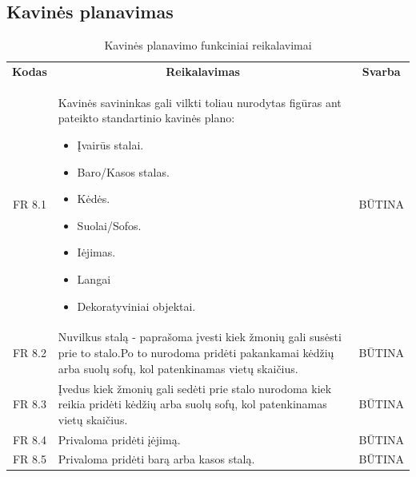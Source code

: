 \documentclass{VUMIFPSkursinis}
\begin{document}
\subsection{Kavinės planavimas}
\begin{center}
	\begin{table}[H]
	\caption{Kavinės planavimo funkciniai reikalavimai}
	\begin{tabular}{|p{2cm}|p{}|p{}|}
	
	\hline
	    \rowcolor{lightgray}
		\multicolumn{3}{|c|}{Kavinės planavimas}\\
		
	\hline
		\multicolumn{1}{|c|}{{\bfseries Kodas}}&
		\multicolumn{1}{|c|}{{\bfseries Reikalavimas}}&
		\multicolumn{1}{|c|}{{\bfseries Svarba}}\\

	\hline
		\multicolumn{1}{|c|}{FR 8.1}&
		{Kavinės savininkas gali vilkti toliau nurodytas figūras ant pateikto standartinio kavinės plano:
		\begin{itemize}
			\item Įvairūs stalai.
			\item Baro/Kasos stalas.
			\item Kėdės.
			\item Suolai/Sofos.
			\item Iėjimas.
			\item Langai
			\item Dekoratyviniai objektai.
		\end{itemize}}&
		\multicolumn{1}{|c|}{BŪTINA}\\

	\hline
	
		\multicolumn{1}{|c|}{FR 8.2}&
		{Nuvilkus stalą - paprašoma įvesti kiek žmonių gali susėsti prie to stalo.Po to nurodoma pridėti pakankamai kėdžių arba suolų sofų, kol patenkinamas vietų skaičius.}&
		\multicolumn{1}{|c|}{BŪTINA}\\				
	\hline
	
		\multicolumn{1}{|c|}{FR 8.3}&
		{Įvedus kiek žmonių gali sedėti prie stalo nurodoma kiek reikia pridėti kėdžių arba suolų sofų, kol patenkinamas vietų skaičius.}&
		\multicolumn{1}{|c|}{BŪTINA}\\				
	\hline
	
		\multicolumn{1}{|c|}{FR 8.4}&
		{Privaloma pridėti įėjimą.}&
		\multicolumn{1}{|c|}{BŪTINA}\\				
	\hline
	
		\multicolumn{1}{|c|}{FR 8.5}&
		{Privaloma pridėti barą arba kasos stalą.}&
		\multicolumn{1}{|c|}{BŪTINA}\\				
	\hline
	

\end{tabular}
\end{table}
\end{center}
\end{document}
